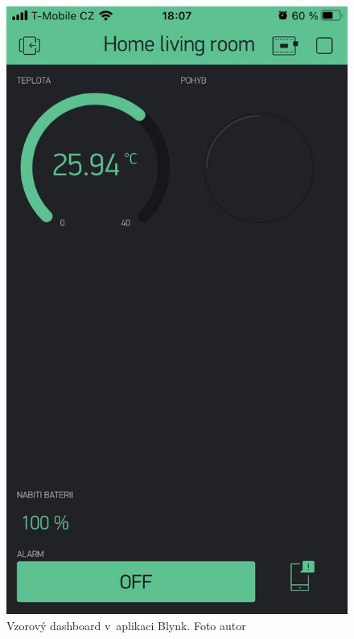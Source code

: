 \begin{figure}[H]
  \begin{minipage}[b]{0.3\textwidth}
    \includegraphics[width=\textwidth]{obrazky-figures/blynk/blynkExample.png}
    \caption{Vzorový dashboard v~aplikaci Blynk. Foto autor}
    \label{blynkExampleDashboard}
  \end{minipage}
  \hfill
  \begin{minipage}[b]{0.3\textwidth}

\end{minipage}
\end{figure}
